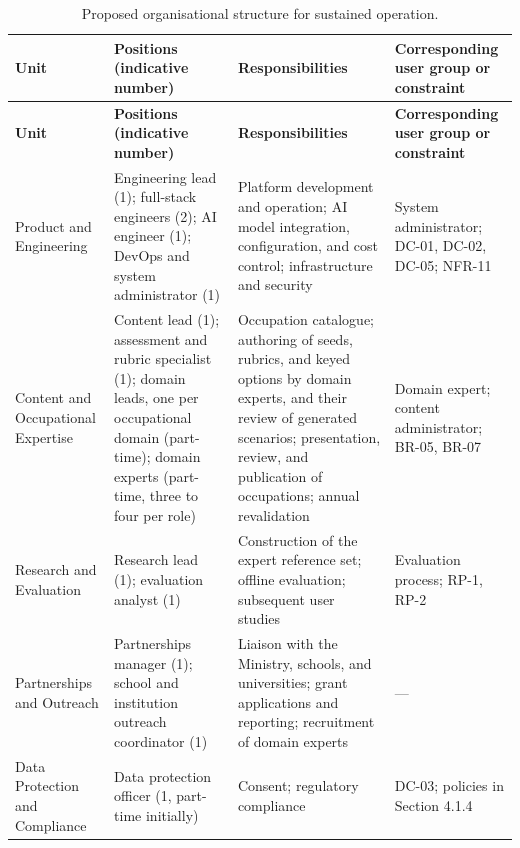 {\small
\begin{longtable}{|>{\raggedright\arraybackslash}p{}|>{\raggedright\arraybackslash}p{}|>{\raggedright\arraybackslash}p{}|>{\raggedright\arraybackslash}p{}|}
\caption{Proposed organisational structure for sustained operation.} \\
\hline
\textbf{Unit} & \textbf{Positions (indicative number)} & \textbf{Responsibilities} & \textbf{Corresponding user group or constraint} \\ \hline
\endfirsthead
\hline
\textbf{Unit} & \textbf{Positions (indicative number)} & \textbf{Responsibilities} & \textbf{Corresponding user group or constraint} \\ \hline
\endhead
Product and Engineering & Engineering lead (1); full-stack engineers (2); AI engineer (1); DevOps and system administrator (1) & Platform development and operation; AI model integration, configuration, and cost control; infrastructure and security & System administrator; DC-01, DC-02, DC-05; NFR-11 \\ \hline
Content and Occupational Expertise & Content lead (1); assessment and rubric specialist (1); domain leads, one per occupational domain (part-\allowbreak{}time); domain experts (part-time, three to four per role) & Occupation catalogue; authoring of seeds, rubrics, and keyed options by domain experts, and their review of generated scenarios; presentation, review, and publication of occupations; annual revalidation & Domain expert; content administrator; BR-05, BR-07 \\ \hline
Research and Evaluation & Research lead (1); evaluation analyst (1) & Construction of the expert reference set; offline evaluation; subsequent user studies & Evaluation process; RP-1, RP-2 \\ \hline
Partnerships and Outreach & Partnerships manager (1); school and institution outreach coordinator (1) & Liaison with the Ministry, schools, and universities; grant applications and reporting; recruitment of domain experts & --- \\ \hline
Data Protection and Compliance & Data protection officer (1, part-time initially) & Consent; regulatory compliance & DC-03; policies in Section 4.1.4 \\ \hline
\end{longtable}
}

